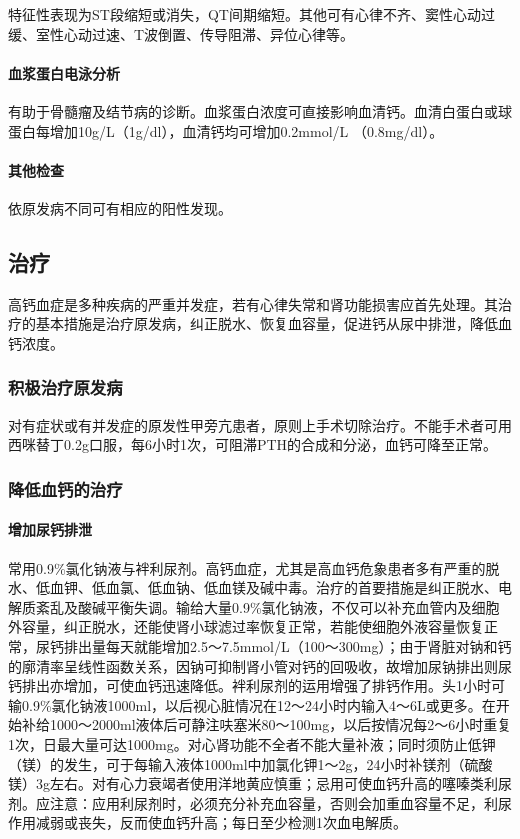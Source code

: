 特征性表现为ST段缩短或消失，QT间期缩短。其他可有心律不齐、窦性心动过缓、室性心动过速、T波倒置、传导阻滞、异位心律等。

\paragraph{血浆蛋白电泳分析}

有助于骨髓瘤及结节病的诊断。血浆蛋白浓度可直接影响血清钙。血清白蛋白或球蛋白每增加10g/L（1g/dl），血清钙均可增加0.2mmol/L
（0.8mg/dl）。

\paragraph{其他检查}

依原发病不同可有相应的阳性发现。

\subsection{治疗}

高钙血症是多种疾病的严重并发症，若有心律失常和肾功能损害应首先处理。其治疗的基本措施是治疗原发病，纠正脱水、恢复血容量，促进钙从尿中排泄，降低血钙浓度。

\subsubsection{积极治疗原发病}

对有症状或有并发症的原发性甲旁亢患者，原则上手术切除治疗。不能手术者可用西咪替丁0.2g口服，每6小时1次，可阻滞PTH的合成和分泌，血钙可降至正常。

\subsubsection{降低血钙的治疗}

\paragraph{增加尿钙排泄}

常用0.9\%氯化钠液与袢利尿剂。高钙血症，尤其是高血钙危象患者多有严重的脱水、低血钾、低血氯、低血钠、低血镁及碱中毒。治疗的首要措施是纠正脱水、电解质紊乱及酸碱平衡失调。输给大量0.9\%氯化钠液，不仅可以补充血管内及细胞外容量，纠正脱水，还能使肾小球滤过率恢复正常，若能使细胞外液容量恢复正常，尿钙排出量每天就能增加2.5～7.5mmol/L（100～300mg）；由于肾脏对钠和钙的廓清率呈线性函数关系，因钠可抑制肾小管对钙的回吸收，故增加尿钠排出则尿钙排出亦增加，可使血钙迅速降低。袢利尿剂的运用增强了排钙作用。头1小时可输0.9\%氯化钠液1000ml，以后视心脏情况在12～24小时内输入4～6L或更多。在开始补给1000～2000ml液体后可静注呋塞米80～100mg，以后按情况每2～6小时重复1次，日最大量可达1000mg。对心肾功能不全者不能大量补液；同时须防止低钾（镁）的发生，可于每输入液体1000ml中加氯化钾1～2g，24小时补镁剂（硫酸镁）3g左右。对有心力衰竭者使用洋地黄应慎重；忌用可使血钙升高的噻嗪类利尿剂。应注意：应用利尿剂时，必须充分补充血容量，否则会加重血容量不足，利尿作用减弱或丧失，反而使血钙升高；每日至少检测1次血电解质。


